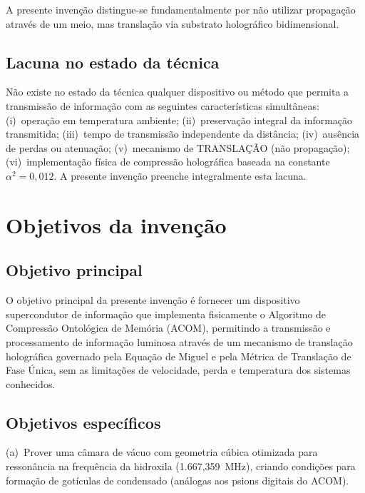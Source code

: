 \documentclass[12pt,a4paper]{article}
\newcommand{\alphaii}{\alpha^2}
\begin{document}
A presente invenção distingue-se fundamentalmente por não
utilizar propagação através de um meio, mas translação via
substrato holográfico bidimensional.

\subsection{Lacuna no estado da técnica}

Não existe no estado da técnica qualquer dispositivo ou método
que permita a transmissão de informação com as seguintes
características simultâneas: (i)~operação em temperatura
ambiente; (ii)~preservação integral da informação transmitida;
(iii)~tempo de transmissão independente da distância;
(iv)~ausência de perdas ou atenuação; (v)~mecanismo de
TRANSLAÇÃO (não propagação); (vi)~implementação física de
compressão holográfica baseada na constante $\alphaii = 0{,}012$.
A presente invenção preenche integralmente esta lacuna.

\newpage
\section{Objetivos da invenção}

\subsection{Objetivo principal}

O objetivo principal da presente invenção é fornecer um
dispositivo supercondutor de informação que implementa
fisicamente o Algoritmo de Compressão Ontológica de Memória
(ACOM), permitindo a transmissão e processamento de informação
luminosa através de um mecanismo de translação holográfica
governado pela Equação de Miguel e pela Métrica de Translação
de Fase Única, sem as limitações de velocidade, perda e
temperatura dos sistemas conhecidos.

\subsection{Objetivos específicos}

(a)~Prover uma câmara de vácuo com geometria cúbica otimizada
para ressonância na frequência da hidroxila (1.667,359~MHz),
criando condições para formação de gotículas de condensado
(análogas aos psions digitais do ACOM).
\end{document}
